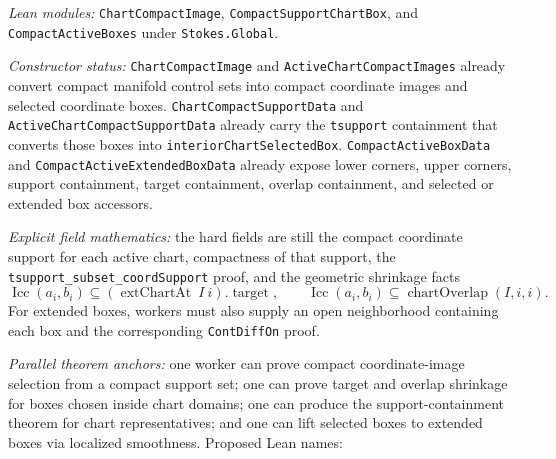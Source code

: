 \begin{definition}
  \label{anc:m6_4_active_compact_support_to_boxes}
  \leanok
  \emph{Lean modules:}
  \texttt{ChartCompactImage}, \texttt{CompactSupportChartBox}, and
  \texttt{CompactActiveBoxes} under \texttt{Stokes.Global}.

  \emph{Constructor status:}
  \texttt{ChartCompactImage} and \texttt{ActiveChartCompactImages} already
  convert compact manifold control sets into compact coordinate images and
  selected coordinate boxes.  \texttt{ChartCompactSupportData} and
  \texttt{ActiveChartCompactSupportData} already carry the
  \texttt{tsupport} containment that converts those boxes into
  \texttt{interiorChartSelectedBox}.  \texttt{CompactActiveBoxData} and
  \texttt{CompactActiveExtendedBoxData} already expose lower corners, upper
  corners, support containment, target containment, overlap containment, and
  selected or extended box accessors.

  \emph{Explicit field mathematics:}
  the hard fields are still the compact coordinate support for each active
  chart, compactness of that support, the
  \texttt{tsupport\_subset\_coordSupport} proof, and the geometric shrinkage
  facts
  \[
    \operatorname{Icc}(a_i,b_i) \subseteq
      (\operatorname{extChartAt}\ I\ i).\operatorname{target},
    \qquad
    \operatorname{Icc}(a_i,b_i) \subseteq
      \operatorname{chartOverlap}(I,i,i).
  \]
  For extended boxes, workers must also supply an open neighborhood containing
  each box and the corresponding \texttt{ContDiffOn} proof.

  \emph{Parallel theorem anchors:}
  one worker can prove compact coordinate-image selection from a compact
  support set; one can prove target and overlap shrinkage for boxes chosen
  inside chart domains; one can produce the support-containment theorem for
  chart representatives; and one can lift selected boxes to extended boxes via
  localized smoothness.  Proposed Lean names:
\end{definition}

